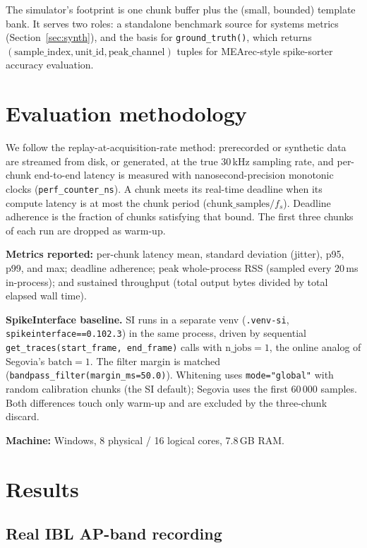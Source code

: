 \documentclass[11pt]{article}
\begin{document}
The simulator's footprint is one chunk buffer plus the (small, bounded) template bank. It serves two
roles: a standalone benchmark source for systems metrics (Section~\ref{sec:synth}), and the basis for
\texttt{ground\_truth()}, which returns $(\text{sample\_index}, \text{unit\_id},
\text{peak\_channel})$ tuples for MEArec-style spike-sorter accuracy evaluation.

\section{Evaluation methodology}

We follow the replay-at-acquisition-rate method: prerecorded or synthetic data are streamed from disk,
or generated, at the true 30\,kHz sampling rate, and per-chunk end-to-end latency is measured with
nanosecond-precision monotonic clocks (\texttt{perf\_counter\_ns}). A chunk meets its real-time
deadline when its compute latency is at most the chunk period ($\text{chunk\_samples} / f_s$). Deadline
adherence is the fraction of chunks satisfying that bound. The first three chunks of each run are
dropped as warm-up.

\textbf{Metrics reported:} per-chunk latency mean, standard deviation (jitter), p95, p99, and max;
deadline adherence; peak whole-process RSS (sampled every 20\,ms in-process); and sustained throughput
(total output bytes divided by total elapsed wall time).

\textbf{SpikeInterface baseline.} SI runs in a separate venv (\texttt{.venv-si},
\texttt{spikeinterface==0.102.3}) in the same process, driven by sequential
\texttt{get\_traces(start\_frame, end\_frame)} calls with $\text{n\_jobs} = 1$, the online analog of
Segovia's $\text{batch} = 1$. The filter margin is matched (\texttt{bandpass\_filter(margin\_ms=50.0)}).
Whitening uses \texttt{mode="global"} with random calibration chunks (the SI default); Segovia uses the
first 60\,000 samples. Both differences touch only warm-up and are excluded by the three-chunk discard.

\textbf{Machine:} Windows, 8 physical / 16 logical cores, 7.8\,GB RAM.

\section{Results}

\subsection{Real IBL AP-band recording}
\label{sec:real}
\end{document}
